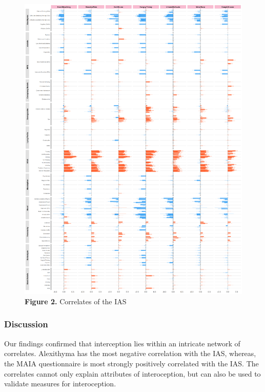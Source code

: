 \documentclass[
  man,
  floatsintext,
  longtable,
  nolmodern,
  notxfonts,
  notimes,
  colorlinks=true,linkcolor=blue,citecolor=blue,urlcolor=blue]{apa7}
\begin{document}
\begin{figure}[H]

\caption{\textbf{Figure 2.} Correlates of the IAS}

{\centering \includegraphics[width=9.48958in,height=\textheight]{figures/clipboard-1619164537.png}

}

\end{figure}%

\subsubsection{Discussion}\label{discussion-1}

Our findings confirmed that interception lies within an intricate
network of correlates. Alexithyma has the most negative correlation with
the IAS, whereas, the MAIA questionnaire is most strongly positively
correlated with the IAS. The correlates cannot only explain attributes
of interoception, but can also be used to validate measures for
interoception.
\end{document}
